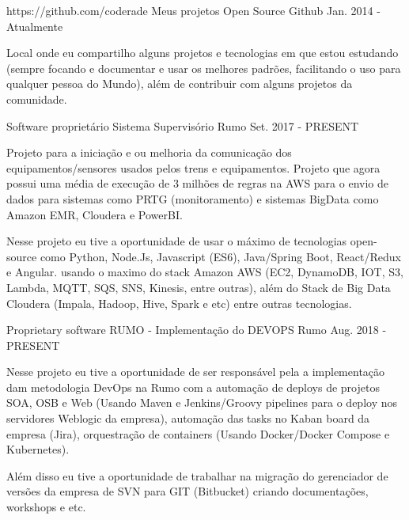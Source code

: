 

\begin{cventries}

  \cventry
    {https://github.com/coderade} %
    {Meus projetos Open Source}%
    {Github} %
    {Jan. 2014 - Atualmente} %
    {
      \begin{cvitems} %
       \item{Local onde eu compartilho alguns projetos e tecnologias em que estou estudando (sempre focando e documentar e usar os melhores padrões, facilitando o uso para qualquer pessoa do Mundo), além de contribuir com alguns projetos da comunidade. }
      \end{cvitems}
    }
  \cventry
    {Software proprietário} %
    {Sistema Supervisório}%
    {Rumo} %
    {Set. 2017 - PRESENT} %
    {
      \begin{cvitems} %
       \item{Projeto para a iniciação e ou melhoria  da comunicação dos  equipamentos/sensores usados pelos trens e equipamentos. Projeto que agora possui uma média de execução de 3 milhões de regras na AWS  para o envio de dados para sistemas como PRTG (monitoramento) e sistemas BigData como  Amazon EMR, Cloudera e PowerBI.}
       \item{Nesse projeto eu tive a oportunidade de usar o máximo de tecnologias open-source como Python, Node.Js, Javascript (ES6), Java/Spring Boot, React/Redux e Angular. usando o maximo do stack Amazon AWS (EC2, DynamoDB, IOT, S3, Lambda, MQTT, SQS, SNS, Kinesis, entre outras), além do Stack de Big Data Cloudera (Impala, Hadoop, Hive, Spark e etc) entre outras tecnologias. }
      \end{cvitems}
    }
    
  \cventry
    {Proprietary software} %
    {RUMO - Implementação do DEVOPS }%
    {Rumo} %
    {Aug. 2018 - PRESENT} %
    {
      \begin{cvitems} %
       \item{Nesse projeto eu tive a oportunidade de ser responsável pela a implementação dam metodologia DevOps na Rumo com  a automação de deploys de projetos SOA, OSB e Web (Usando Maven e Jenkins/Groovy pipelines para o deploy nos servidores Weblogic da empresa), automação das tasks no Kaban board da empresa (Jira), orquestração de containers (Usando Docker/Docker Compose e Kubernetes). }
       \item{Além disso eu tive a oportunidade de trabalhar na migração do gerenciador de versões da empresa de SVN para GIT (Bitbucket) criando documentações, workshops e etc.}
      \end{cvitems}
    }
    

\end{cventries}

